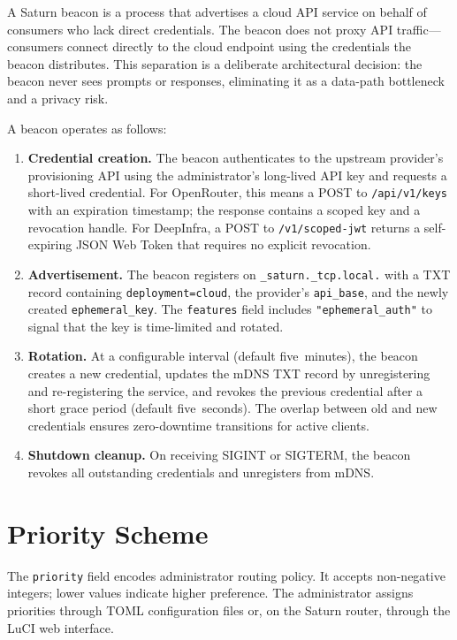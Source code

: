 A Saturn beacon is a process that advertises a cloud API service on behalf of consumers who lack direct credentials. The beacon does not proxy API traffic---consumers connect directly to the cloud endpoint using the credentials the beacon distributes. This separation is a deliberate architectural decision: the beacon never sees prompts or responses, eliminating it as a data-path bottleneck and a privacy risk.

A beacon operates as follows:

\begin{enumerate}
  \item \textbf{Credential creation.} The beacon authenticates to the upstream provider's provisioning API using the administrator's long-lived API key and requests a short-lived credential. For OpenRouter, this means a POST to \texttt{/api/v1/keys} with an expiration timestamp; the response contains a scoped key and a revocation handle. For DeepInfra, a POST to \texttt{/v1/scoped-jwt} returns a self-expiring JSON Web Token that requires no explicit revocation.

  \item \textbf{Advertisement.} The beacon registers on \texttt{\_saturn.\_tcp.local.} with a TXT record containing \texttt{deployment=cloud}, the provider's \texttt{api\_base}, and the newly created \texttt{ephemeral\_key}. The \texttt{features} field includes \texttt{"ephemeral\_auth"} to signal that the key is time-limited and rotated.

  \item \textbf{Rotation.} At a configurable interval (default five~minutes), the beacon creates a new credential, updates the mDNS TXT record by unregistering and re-registering the service, and revokes the previous credential after a short grace period (default five~seconds). The overlap between old and new credentials ensures zero-downtime transitions for active clients.

  \item \textbf{Shutdown cleanup.} On receiving SIGINT or SIGTERM, the beacon revokes all outstanding credentials and unregisters from mDNS.
\end{enumerate}

\section{Priority Scheme}
\label{app:priorities}

The \texttt{priority} field encodes administrator routing policy. It accepts non-negative integers; lower values indicate higher preference. The administrator assigns priorities through TOML configuration files or, on the Saturn router, through the LuCI web interface.

